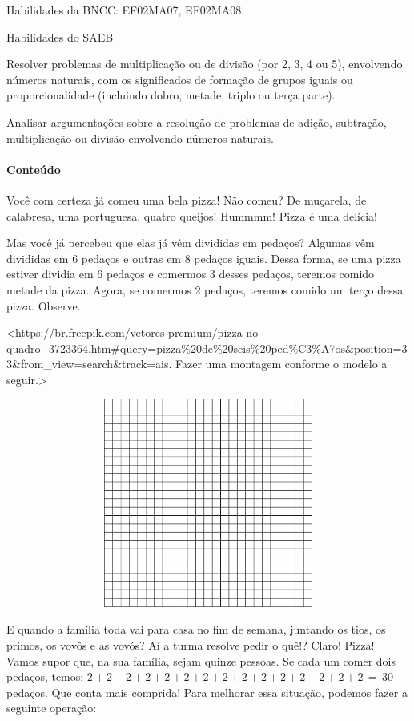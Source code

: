 Habilidades da BNCC: EF02MA07, EF02MA08.

Habilidades do SAEB

Resolver problemas de multiplicação ou de divisão (por 2, 3, 4 ou 5),
envolvendo números naturais, com os significados de formação de grupos
iguais ou proporcionalidade (incluindo dobro, metade, triplo ou terça
parte).

Analisar argumentações sobre a resolução de problemas de adição,
subtração, multiplicação ou divisão envolvendo números naturais.

\paragraph{Conteúdo}\label{conteuxfado-7}

Você com certeza já comeu uma bela pizza! Não comeu? De muçarela, de
calabresa, uma portuguesa, quatro queijos! Hummmm! Pizza é uma delícia!

Mas você já percebeu que elas já vêm divididas em pedaços? Algumas vêm
divididas em 6 pedaços e outras em 8 pedaços iguais. Dessa forma, se uma
pizza estiver dividia em 6 pedaços e comermos 3 desses pedaços, teremos
comido metade da pizza. Agora, se comermos 2 pedaços, teremos comido um
terço dessa pizza. Observe.

\textless{}https://br.freepik.com/vetores-premium/pizza-no-quadro\_3723364.htm\#query=pizza\%20de\%20seis\%20ped\%C3\%A7os\&position=33\&from\_view=search\&track=ais.
Fazer uma montagem conforme o modelo a seguir.\textgreater{}

\includegraphics[width=6.03125in,height=2.70150in]{media/image99.png}

E quando a família toda vai para casa no fim de semana, juntando os
tios, os primos, os vovôs e as vovós? Aí a turma resolve pedir o quê!?
Claro! Pizza! Vamos supor que, na sua família, sejam quinze pessoas. Se
cada um comer dois pedaços, temos:
\(2 + 2 + 2 + 2 + 2 + 2 + 2 + 2 + 2 + 2 + 2 + 2 + 2 + 2 + 2\, = \, 30\ \)pedaços.
Que conta mais comprida! Para melhorar essa situação, podemos fazer a
seguinte operação:


